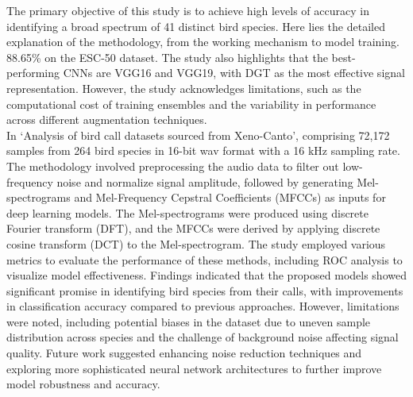 The primary objective of this study is to achieve high levels of accuracy in identifying a broad spectrum of 41 distinct bird species. 
Here lies the detailed explanation of the methodology, from the working mechanism to model training.
88.65\% on the ESC-50 dataset. The study also highlights that the
best-performing CNNs are VGG16 and VGG19, with DGT as the most effective signal
representation. However, the study acknowledges limitations, such as the
computational cost of training ensembles and the variability in performance
across different augmentation techniques.\\

In\cite{wang2022efficient} `Analysis of bird call datasets sourced
from Xeno-Canto', comprising 72,172 samples from 264 bird species in 16-bit wav
format with a 16 kHz sampling rate. The methodology involved preprocessing the
audio data to filter out low-frequency noise and normalize signal amplitude,
followed by generating Mel-spectrograms and Mel-Frequency Cepstral Coefficients
(MFCCs) as inputs for deep learning models. The Mel-spectrograms were produced
using discrete Fourier transform (DFT), and the MFCCs were derived by applying
discrete cosine transform (DCT) to the Mel-spectrogram. The study employed
various metrics to evaluate the performance of these methods, including ROC
analysis to visualize model effectiveness. Findings indicated that the proposed
models showed significant promise in identifying bird species from their calls,
with improvements in classification accuracy compared to previous approaches.
However, limitations were noted, including potential biases in the dataset due
to uneven sample distribution across species and the challenge of background
noise affecting signal quality. Future work suggested enhancing noise reduction
techniques and exploring more sophisticated neural network architectures to
further improve model robustness and accuracy.\\

